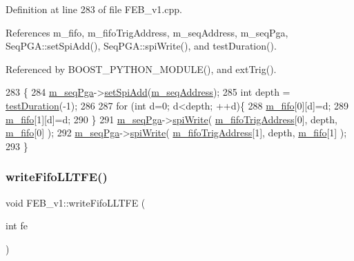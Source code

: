 Definition at line 283 of file F\+E\+B\+\_\+v1.\+cpp.



References m\+\_\+fifo, m\+\_\+fifo\+Trig\+Address, m\+\_\+seq\+Address, m\+\_\+seq\+Pga, Seq\+P\+G\+A\+::set\+Spi\+Add(), Seq\+P\+G\+A\+::spi\+Write(), and test\+Duration().



Referenced by B\+O\+O\+S\+T\+\_\+\+P\+Y\+T\+H\+O\+N\+\_\+\+M\+O\+D\+U\+L\+E(), and ext\+Trig().


\begin{DoxyCode}
283                          \{
284   \hyperlink{classFEB__v1_a6c7804ac86796f233a8393043adf2e77}{m\_seqPga}->\hyperlink{classSeqPGA_ac998ce3a6d9b5f2e88cc8393f8c1df53}{setSpiAdd}(\hyperlink{classFEB__v1_a1c1eb093fd1733b9510fcf8bc5c7ad08}{m\_seqAddress});
285   \textcolor{keywordtype}{int} depth = \hyperlink{classFEB__v1_a7f1db8ca9490172fce7603da9e703dec}{testDuration}(-1);
286  
287   \textcolor{keywordflow}{for} (\textcolor{keywordtype}{int} d=0; d<depth; ++d)\{
288     \hyperlink{classFEB__v1_ae5b770f2f5ffb97324862c93e3153985}{m\_fifo}[0][d]=d;
289     \hyperlink{classFEB__v1_ae5b770f2f5ffb97324862c93e3153985}{m\_fifo}[1][d]=d;
290   \}
291   \hyperlink{classFEB__v1_a6c7804ac86796f233a8393043adf2e77}{m\_seqPga}->\hyperlink{classSeqPGA_ad4421841ce4ce8b88ad13f63216f0743}{spiWrite}( \hyperlink{classFEB__v1_ad41f8756c4e15815c6d5e35902cf2257}{m\_fifoTrigAddress}[0], depth, 
      \hyperlink{classFEB__v1_ae5b770f2f5ffb97324862c93e3153985}{m\_fifo}[0] );
292   \hyperlink{classFEB__v1_a6c7804ac86796f233a8393043adf2e77}{m\_seqPga}->\hyperlink{classSeqPGA_ad4421841ce4ce8b88ad13f63216f0743}{spiWrite}( \hyperlink{classFEB__v1_ad41f8756c4e15815c6d5e35902cf2257}{m\_fifoTrigAddress}[1], depth, 
      \hyperlink{classFEB__v1_ae5b770f2f5ffb97324862c93e3153985}{m\_fifo}[1] );
293 \}
\end{DoxyCode}
\mbox{\label{classFEB__v1_a9dbedaebc2e3569e8b5fc0be782dbce3}} 
\subsubsection{\texorpdfstring{write\+Fifo\+L\+L\+T\+F\+E()}{writeFifoLLTFE()}}
{\footnotesize\ttfamily void F\+E\+B\+\_\+v1\+::write\+Fifo\+L\+L\+T\+FE (\begin{DoxyParamCaption}\item[{int}]{fe }\end{DoxyParamCaption})}



